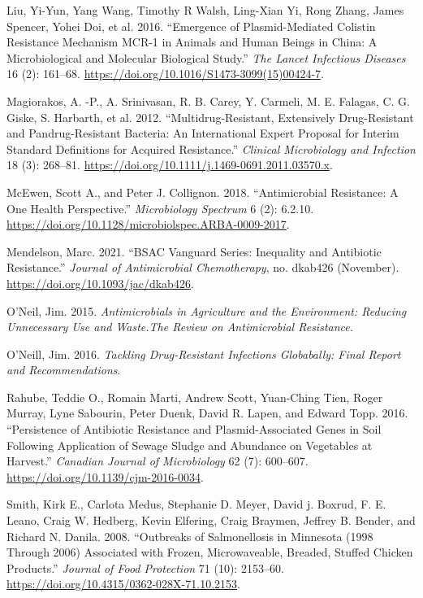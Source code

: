 \documentclass[]{tufte-handout}
\newlength{\cslhangindent}
\newenvironment{CSLReferences}[3] %
 {%
  \setlength{\parindent}{0pt}
  \ifodd #1 \everypar{\setlength{\hangindent}{\cslhangindent}}\ignorespaces\fi
  \ifnum #2 > 0
  \setlength{\parskip}{#2\baselineskip}
  \fi
 }%
 {}
\begin{document}
\begin{CSLReferences}{1}{0}
\leavevmode{}%
Liu, Yi-Yun, Yang Wang, Timothy R Walsh, Ling-Xian Yi, Rong Zhang, James
Spencer, Yohei Doi, et al. 2016. {``Emergence of Plasmid-Mediated
Colistin Resistance Mechanism {MCR}-1 in Animals and Human Beings in
{China}: A Microbiological and Molecular Biological Study.''} \emph{The
Lancet Infectious Diseases} 16 (2): 161--68.
\url{https://doi.org/10.1016/S1473-3099(15)00424-7}.

\leavevmode{}%
Magiorakos, A. -P., A. Srinivasan, R. B. Carey, Y. Carmeli, M. E.
Falagas, C. G. Giske, S. Harbarth, et al. 2012. {``Multidrug-Resistant,
Extensively Drug-Resistant and Pandrug-Resistant Bacteria: An
International Expert Proposal for Interim Standard Definitions for
Acquired Resistance.''} \emph{Clinical Microbiology and Infection} 18
(3): 268--81. \url{https://doi.org/10.1111/j.1469-0691.2011.03570.x}.

\leavevmode{}%
McEwen, Scott A., and Peter J. Collignon. 2018. {``Antimicrobial
{Resistance}: A {One Health Perspective}.''} \emph{Microbiology
Spectrum} 6 (2): 6.2.10.
\url{https://doi.org/10.1128/microbiolspec.ARBA-0009-2017}.

\leavevmode{}%
Mendelson, Marc. 2021. {``{BSAC Vanguard Series}: Inequality and
Antibiotic Resistance.''} \emph{Journal of Antimicrobial Chemotherapy},
no. dkab426 (November). \url{https://doi.org/10.1093/jac/dkab426}.

\leavevmode{}%
O'Neil, Jim. 2015. \emph{Antimicrobials in Agriculture and the
Environment: Reducing Unnecessary Use and Waste.{The} Review on
Antimicrobial Resistance.}

\leavevmode{}%
O'Neill, Jim. 2016. \emph{Tackling Drug-Resistant Infections Globabally:
Final Report and Recommendations}.

\leavevmode{}%
Rahube, Teddie O., Romain Marti, Andrew Scott, Yuan-Ching Tien, Roger
Murray, Lyne Sabourin, Peter Duenk, David R. Lapen, and Edward Topp.
2016. {``Persistence of Antibiotic Resistance and Plasmid-Associated
Genes in Soil Following Application of Sewage Sludge and Abundance on
Vegetables at Harvest.''} \emph{Canadian Journal of Microbiology} 62
(7): 600--607. \url{https://doi.org/10.1139/cjm-2016-0034}.

\leavevmode{}%
Smith, Kirk E., Carlota Medus, Stephanie D. Meyer, David j. Boxrud, F.
E. Leano, Craig W. Hedberg, Kevin Elfering, Craig Braymen, Jeffrey B.
Bender, and Richard N. Danila. 2008. {``Outbreaks of {Salmonellosis} in
{Minnesota} (1998 Through 2006) {Associated} with {Frozen},
{Microwaveable}, {Breaded}, {Stuffed Chicken Products}.''} \emph{Journal
of Food Protection} 71 (10): 2153--60.
\url{https://doi.org/10.4315/0362-028X-71.10.2153}.


\end{CSLReferences}
\end{document}
